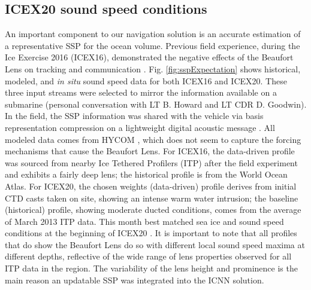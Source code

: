 \subsection{ICEX20 sound speed conditions}

An important component to our navigation solution is an accurate estimation of a representative SSP for the ocean volume.
Previous field experience, during the Ice Exercise 2016 (ICEX16), demonstrated the negative effects of the Beaufort Lens on tracking and communication \citep{schmidt_acoustic_2016}.
Fig. \ref{fig:sspExpectation} shows historical, modeled, and \textit{in situ} sound speed data for both ICEX16 and ICEX20.
These three input streams were selected to mirror the information available on a submarine (personal conversation with LT B. Howard and LT CDR D. Goodwin). 
In the field, the SSP information was shared with the vehicle via basis representation compression on a lightweight digital acoustic message \citep{bhatt_embedded_2022}. 
All modeled data comes from HYCOM \cite{chassignet_hycom_2007}, which does not seem to capture the forcing mechanisms that cause the Beaufort Lens.
For ICEX16, the data-driven profile was sourced from nearby Ice Tethered Profilers (ITP) after the field experiment \cite{Krishfield2008,toole_ice-tethered_2011} and exhibits a fairly deep lens; the historical profile is from the World Ocean Atlas.
For ICEX20, the chosen weights (data-driven) profile derives from initial CTD casts taken on site, showing an intense warm water intrusion; the baseline (historical) profile, showing moderate ducted conditions, comes from the average of March 2013 ITP data.
This month best matched sea ice and sound speed conditions at the beginning of ICEX20 \citep{bhatt_embedded_2022}.
It is important to note that all profiles that do show the Beaufort Lens do so with different local sound speed maxima at different depths, reflective of the wide range of lens properties observed for all ITP data in the region. 
The variability of the lens height and prominence is the main reason an updatable SSP was integrated into the ICNN solution.

